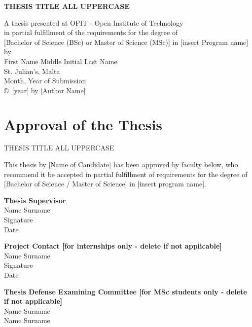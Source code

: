 \documentclass[12pt]{report}
\begin{document}
\begin{titlepage}
\centering
{\Large\bfseries THESIS TITLE ALL UPPERCASE \par}
\vfill
A thesis presented at OPIT - Open Institute of Technology\\
in partial fulfillment of the requirements for the degree of\\
{[Bachelor of Science (BSc) or Master of Science (MSc)] in [insert Program name]}\\
\vfill
by\\
First Name Middle Initial Last Name\\
\vfill
St. Julian's, Malta\\
Month, Year of Submission\\
\vfill
\copyright~[year] by [Author Name]
\end{titlepage}

\chapter*{Approval of the Thesis}
\begin{center}
    {\Large THESIS TITLE ALL UPPERCASE }
\end{center}
\vspace{1cm}

This thesis by [Name of Candidate] has been approved by faculty below, who recommend it be accepted in partial fulfillment of requirements for the degree of [Bachelor of Science / Master of Science] in [insert program name].

\vspace{1cm}
\textbf{Thesis Supervisor} \\
Name Surname \\
Signature \\
Date 

\vspace{1cm}
\textbf{Project Contact [for internships only - delete if not applicable]} \\
Name Surname \\
Signature \\
Date 

\vspace{1cm}
\textbf{Thesis Defense Examining Committee [for MSc students only - delete if not applicable]} \\
Name Surname \\
Name Surname
\end{document}
